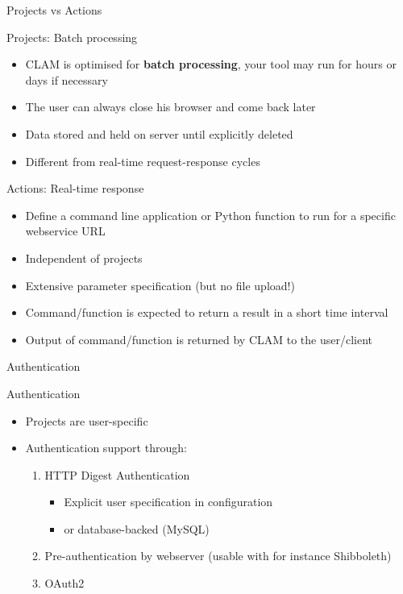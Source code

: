 \documentclass[xcolor=table,10pt,t]{beamer}
\begin{document}
\begin{frame}{Projects vs Actions}
    \begin{block}{Projects: Batch processing}
      \begin{itemize}
        \item CLAM is optimised for \textbf{batch processing}, your tool may run for hours or days if necessary
        \item The user can always close his browser and come back later
        \item Data stored and held on server until explicitly deleted
        \item Different from real-time request-response cycles
      \end{itemize}
    \end{block}

    \begin{block}{Actions: Real-time response}
      \begin{itemize}
        \item Define a command line application or Python function to run for a specific webservice URL
        \item Independent of projects
        \item Extensive parameter specification (but no file upload!)
        \item Command/function is expected to return a result in a short time interval
        \item Output of command/function is returned by CLAM to the user/client
      \end{itemize}
    \end{block}
\end{frame}


\begin{frame}{Authentication}
  \begin{block}{Authentication}
      \begin{itemize}
        \item Projects are user-specific
        \item Authentication support through:
        \begin{enumerate}
            \item HTTP Digest Authentication
            \begin{itemize}
                \item Explicit user specification in configuration
                \item or database-backed (MySQL)
            \end{itemize}
            \item Pre-authentication by webserver (usable with for instance Shibboleth)
            \item OAuth2
        \end{enumerate}
       \end{itemize}
  \end{block}
\end{frame}
\end{document}
